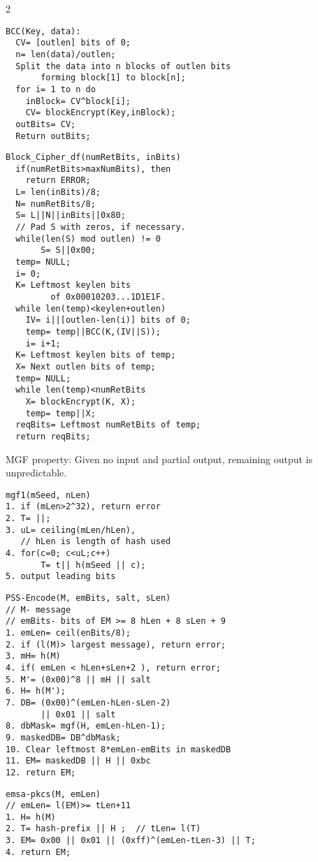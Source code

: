\begin{multicols} {2}
{\begin{verbatim}
BCC(Key, data):
  CV= [outlen] bits of 0;
  n= len(data)/outlen;
  Split the data into n blocks of outlen bits 
       forming block[1] to block[n];
  for i= 1 to n do
    inBlock= CV^block[i];
    CV= blockEncrypt(Key,inBlock);
  outBits= CV;
  Return outBits;
\end{verbatim}

\begin{verbatim}
Block_Cipher_df(numRetBits, inBits)
  if(numRetBits>maxNumBits), then 
    return ERROR;
  L= len(inBits)/8;
  N= numRetBits/8;
  S= L||N||inBits||0x80;
  // Pad S with zeros, if necessary.
  while(len(S) mod outlen) != 0
       S= S||0x00;
  temp= NULL;
  i= 0;
  K= Leftmost keylen bits 
         of 0x00010203...1D1E1F.
  while len(temp)<keylen+outlen)
    IV= i||[outlen-len(i)] bits of 0;
    temp= temp||BCC(K,(IV||S));
    i= i+1;
  K= Leftmost keylen bits of temp;
  X= Next outlen bits of temp;
  temp= NULL;
  while len(temp)<numRetBits
    X= blockEncrypt(K, X);
    temp= temp||X;
  reqBits= Leftmost numRetBits of temp;
  return reqBits;
\end{verbatim}
MGF property:  Given no input and partial output, remaining output is unpredictable.
\begin{verbatim}
mgf1(mSeed, nLen)
1. if (mLen>2^32), return error
2. T= ||;
3. uL= ceiling(mLen/hLen), 
   // hLen is length of hash used
4. for(c=0; c<uL;c++)
       T= t|| h(mSeed || c);
5. output leading bits
\end{verbatim}
\begin{verbatim}
PSS-Encode(M, emBits, salt, sLen)
// M- message
// emBits- bits of EM >= 8 hLen + 8 sLen + 9
1. emLen= ceil(enBits/8);
2. if (l(M)> largest message), return error;
3. mH= h(M)
4. if( emLen < hLen+sLen+2 ), return error;
5. M'= (0x00)^8 || mH || salt
6. H= h(M');
7. DB= (0x00)^(emLen-hLen-sLen-2) 
       || 0x01 || salt
8. dbMask= mgf(H, emLen-hLen-1);
9. maskedDB= DB^dbMask;
10. Clear leftmost 8*emLen-emBits in maskedDB
11. EM= maskedDB || H || 0xbc
12. return EM;
\end{verbatim}
\begin{verbatim}
emsa-pkcs(M, emLen)
// emLen= l(EM)>= tLen+11
1. H= h(M)
2. T= hash-prefix || H ;  // tLen= l(T)
3. EM= 0x00 || 0x01 || (0xff)^(emLen-tLen-3) || T;
4. return EM;
\end{verbatim}
}
\end{multicols}

